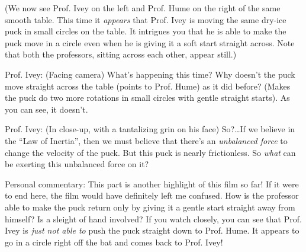 \documentclass[a6paper]{article}
\newcommand{\perscom}[1]{
    {\footnotesize Personal commentary:  #1}
}
\begin{document}
(We now see Prof. Ivey on the left and Prof. Hume on the right of the same smooth table. This time it \emph{appears} that Prof. Ivey is moving the same dry-ice puck in small circles on the table. It intrigues you that he is able to make the puck move in a circle even when he is giving it a soft start straight across. Note that both the professors, sitting across each other, appear still.)

Prof. Ivey: (Facing camera) What's happening this time? Why doesn't the puck move straight across the table (points to Prof. Hume) as it did before? (Makes the puck do two more rotations in small circles with gentle straight starts). As you can see, it doesn't. 

Prof. Ivey: (In close-up, with a tantalizing grin on his face) So?\dots\space If we believe in the ``Law of Inertia'', then we must believe that there's an \emph{unbalanced force} to change the velocity of the puck. But this puck is nearly frictionless. So \emph{what} can be exerting this unbalanced force on it?

\perscom{ This part is another highlight of this film so far! If it were to end here, the film would have definitely left me confused. How is the professor able to make the puck return only by giving it a gentle start straight away from himself? Is a sleight of hand involved? If you watch closely, you can see that Prof. Ivey is \emph{just not able to} push the puck straight down to Prof. Hume. It appears to go in a circle right off the bat and comes back to Prof. Ivey!}
\end{document}
